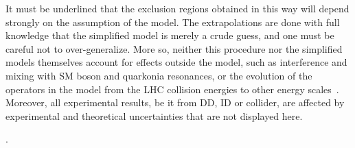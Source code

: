 It must be underlined that the exclusion regions obtained in this way will depend strongly on the assumption of the model.
The extrapolations are done with full knowledge that the simplified model is merely a crude guess, and one must be careful not to over-generalize.
More so, neither this procedure nor the simplified models themselves account for effects outside the model, such as interference and mixing with SM boson and quarkonia resonances, or the evolution of the operators in the model from the LHC collision energies to other energy scales~\cite{DEramo:2014nmf}.
Moreover, all experimental results, be it from DD, ID or collider, are affected by experimental and theoretical uncertainties that are not displayed here.






. 







